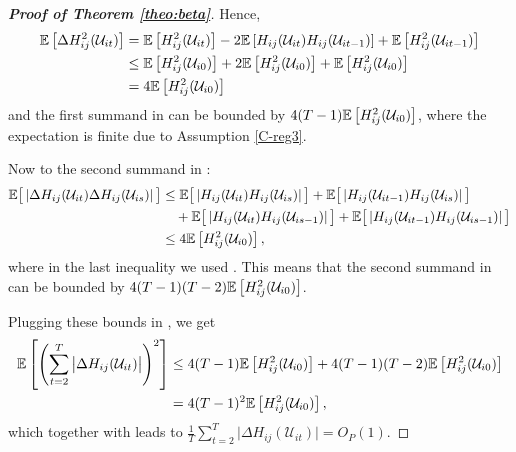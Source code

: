 \documentclass[a4paper,12pt]{article}
\makeatletter
\renewcommand{\eqref}[1]{\tagform@{\ref{#1}}}
\makeatother
\begin{document}
\begin{proof}[\textnormal{\textbf{Proof of Theorem \ref{theo:beta}}}]
Hence, 
\begin{align*}
 \mathbb{E} \left[ \Delta  H^2_{ij} (\mathcal{U}_{it})  \right]  &=  \mathbb{E} \left[ H^2_{ij} (\mathcal{U}_{it}) \right] - 2\mathbb{E} \left[ H_{ij} (\mathcal{U}_{it}) H_{ij}(\mathcal{U}_{it-1}) \right]  + \mathbb{E} \left[ H^2_{ij}(\mathcal{U}_{it-1}) \right] \\
& \leq \mathbb{E} \left[ H^2_{ij} (\mathcal{U}_{i0}) \right] + 2\mathbb{E} \left[ H^2_{ij} (\mathcal{U}_{i0}) \right]  + \mathbb{E} \left[ H^2_{ij}(\mathcal{U}_{i0}) \right] \\
&= 4 \mathbb{E} \left[ H^2_{ij} (\mathcal{U}_{i0}) \right]
\end{align*}
and the first summand in \eqref{theo-regs-proof-4} can be bounded by $4(T - 1)\mathbb{E} \left[ H^2_{ij} (\mathcal{U}_{i0}) \right]$, where the expectation is finite due to Assumption \ref{C-reg3}.

Now to the second summand in \eqref{theo-regs-proof-4}:
\begin{align*}
\mathbb{E} \big[ \left|\Delta  H_{ij} (\mathcal{U}_{it}) \Delta  H_{ij} (\mathcal{U}_{is})\right| \big] &\leq \mathbb{E} \big[ \left| H_{ij} (\mathcal{U}_{it}) H_{ij} (\mathcal{U}_{is}) \right|\big] + \mathbb{E} \big[ \left| H_{ij} (\mathcal{U}_{it-1}) H_{ij} (\mathcal{U}_{is}) \right|\big] \\
&\quad + \mathbb{E} \big[ \left| H_{ij} (\mathcal{U}_{it}) H_{ij} (\mathcal{U}_{is-1}) \right|\big] + \mathbb{E} \big[ \left| H_{ij} (\mathcal{U}_{it-1}) H_{ij} (\mathcal{U}_{is-1}) \right|\big] \\
&\leq  4\mathbb{E} \left[ H^2_{ij}(\mathcal{U}_{i0}) \right],
\end{align*}
where in the last inequality we used \eqref{theo:beta:proof5}. This means that the second summand in \eqref{theo-regs-proof-4} can be bounded by $4(T-1)(T-2) \mathbb{E} \left[ H^2_{ij} (\mathcal{U}_{i0}) \right]$.

Plugging these bounds in \eqref{theo-regs-proof-4}, we get
\begin{align*}
\mathbb{E} \left[ \left(\sum_{t=2}^T \big|\Delta  H_{ij} (\mathcal{U}_{it})\big|\right)^2 \right] &\leq 4(T-1) \mathbb{E} \left[ H^2_{ij} (\mathcal{U}_{i0}) \right] + 4(T-1)(T-2)\mathbb{E} \left[ H^2_{ij} (\mathcal{U}_{i0}) \right] \\
&= 4 (T-1)^2 \mathbb{E} \left[ H^2_{ij} (\mathcal{U}_{i0}) \right],
\end{align*}
which together with \eqref{theo-regs-proof-3} leads to $\frac{1}{T}\sum_{t=2}^T \big|\Delta H_{ij}(\mathcal{U}_{it})\big| = O_P(1)$.


\end{proof}
\end{document}
